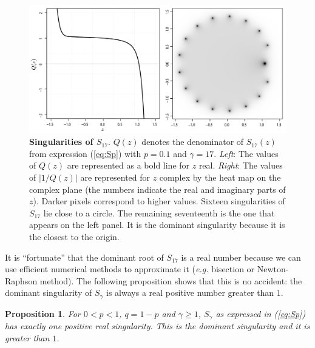 \documentclass{article}
\newtheorem{proposition}{Proposition}
\begin{document}
\begin{figure}[h]
\centering
\includegraphics[scale=0.4]{singularityS.pdf}
\caption{\textbf{Singularities of $S_{17}$}. $Q(z)$ denotes the
denominator of $S_{17}(z)$ from expression (\ref{eq:Sp}) with $p=0.1$ and
$\gamma=17$. \textit{Left}: The values of $Q(z)$ are represented as a bold
line for $z$ real. \textit{Right}: The values of $|1/Q(z)|$ are
represented for $z$ complex by the heat map on the complex plane (the
numbers indicate the real and imaginary parts of $z$). Darker pixels
correspond to higher values. Sixteen singularities of $S_{17}$ lie close
to a circle. The remaining seventeenth is the one that appears on the left
panel. It is the dominant singularity because it is the closest to the
origin.}
\label{fig:plotQ}
\end{figure}

It is ``fortunate'' that the dominant root of $S_{17}$ is a real number
because we can use efficient numerical methods to approximate it
(\textit{e.g.} bisection or Newton-Raphson method). The following
proposition shows that this is no accident: the dominant singularity of
$S_\gamma$ is always a real positive number greater than $1$.

\begin{proposition}
\label{th:roots}
For $0 < p < 1$, $q = 1-p$ and $\gamma \geq 1$, $S_\gamma$ as expressed in
(\ref{eq:Sp}) has exactly one positive real singularity. This is the
dominant singularity and it is greater than $1$.
\end{proposition}
\end{document}

